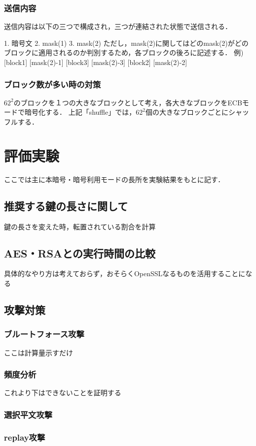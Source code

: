 \documentclass{jsarticle}
\begin{document}
\subsubsection{送信内容}
送信内容は以下の三つで構成され，三つが連結された状態で送信される．

1. 暗号文
2. mask(1)
3. mask(2)
ただし，mask(2)に関してはどのmask(2)がどのブロックに適用されるのか判別するため，各ブロックの後ろに記述する．
例) [block1] [mask(2)-1] [block3] [mask(2)-3] [block2] [mask(2)-2]

\subsubsection{ブロック数が多い時の対策}
\(62^2\)のブロックを１つの大きなブロックとして考え，各大きなブロックをECBモードで暗号化する．
上記「shuffle」では，\(62^2\)個の大きなブロックごとにシャッフルする．

\section{評価実験}
ここでは主に本暗号・暗号利用モードの長所を実験結果をもとに記す．
\subsection{推奨する鍵の長さに関して}
鍵の長さを変えた時，転置されている割合を計算
\subsection{AES・RSAとの実行時間の比較}
具体的なやり方は考えておらず，おそらくOpenSSLなるものを活用することになる
\subsection{攻撃対策}
\subsubsection{ブルートフォース攻撃}
ここは計算量示すだけ
\subsubsection{頻度分析}
これより下はできないことを証明する
\subsubsection{選択平文攻撃}
\subsubsection{replay攻撃}
\end{document}
